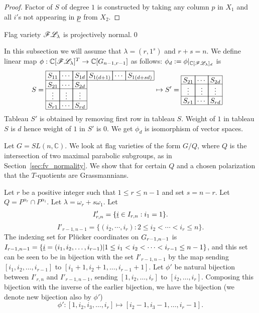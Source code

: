 {\begin{proof}
    Factor of \(S\) of degree \(1\) is constructed by taking any column \(p\) in \(X_1\) 
    and all \(i'\)s not appearing in \(\underline{p}\) from \(X_2\).
\end{proof}
\begin{corollary}
    Flag variety \(\mathscr{F}\mathscr{L}_{\lambda}\) is projectively normal.\qed
\end{corollary}
In this subsection we will assume that \(\lambda = (r,1^s)\) and \(r+s=n\). 
We define linear map \(\phi:\mathbb{C}[\mathscr{F}\mathscr{L}_{\lambda}]^T \to \mathbb{C}[G_{{n-1},{r-1}}]\) as follows: \(\phi_d := \phi|_{\mathbb{C}[\mathscr{F}\mathscr{L}_{\lambda}]_d}\) is
\begin{align*}
    S=
    \begin{array}[c]{*{6}c}\cline{1-6}
        \lr{S_{11}}&\lr{\cdots}&\lr{S_{1d}}&\lr{S_{1(d+1)}}&\lr{\cdots}&\lr{S_{1(d+sd)}}\\\cline{1-6}
        \lr{S_{21}}&\lr{\cdots}&\lr{S_{2d}}\\\cline{1-3}
        \lr{\vdots}&\lr{\vdots}&\lr{\vdots}\\\cline{1-3}
        \lr{S_{r1}}&\lr{\cdots}&\lr{S_{rd}}\\\cline{1-3}
    \end{array}
    &\mapsto S'=
    \begin{array}[c]{*{3}c}\cline{1-3}
        \lr{S_{21}}&\lr{\cdots}&\lr{S_{2d}}\\\cline{1-3}
        \lr{\vdots}&\lr{\vdots}&\lr{\vdots}\\\cline{1-3}
        \lr{S_{r1}}&\lr{\cdots}&\lr{S_{rd}}\\\cline{1-3}
    \end{array}
\end{align*}
Tableau \(S'\) is obtained by removing first row in tableau \(S\). Weight of \(1\) in tableau \(S\) is \(d\) hence weight of \(1\) in \(S'\) is \(0\). We get \(\phi_d\) is isomorphism of vector spaces. 
}
Let $G=SL(n,{\mathbb C})$. We look at flag varieties of the form $G/Q$, where $Q$ is the intersection of two maximal parabolic subgroups, as in Section~\ref{sec:fv_normality}. 
We show that for certain $Q$ and a chosen polarization that the $T$-quotients are Grassmannians.
 
Let $r$ be a positive integer such that $1 \leq r \leq n-1$ and set $s = n-r$.  Let  $Q = P^{\alpha_r} \cap P^{\alpha_1}$. Let $\lambda = \omega_r + s\omega_1$.
Let \[I'_{r,n} = \{{\underline i} \in I_{r,n} : i_1 = 1\}.\]
\[I'_{r-1,n-1} = \{(i_2,\cdots,i_r):2 \le i_2 < \cdots < i_r \le n\}.\]
The indexing set for  Pl\"{u}cker coordinates on \(G_{{r-1},{n-1}}\) is $I_{r-1,n-1} = \{ \underline{i}=(i_1,i_2,\ldots,i_{r-1}) | 1 \leq i_1 < i_2 < \cdots < i_{r-1} \leq n-1\}$, and this set can be seen to be in bijection with the set $I'_{r-1,n-1}$ by the map sending 
$[i_1,i_2,\ldots,i_{r-1}]$ to $[i_1 + 1, i_2 + 1,\ldots, i_{r-1}+1]$.  Let \(\phi'\) be natural bijection between \(I'_{r,n}\) and \(I'_{r-1,n-1}\), sending $[1, i_2,\ldots,i_r]$ to $[i_2,\ldots,i_r]$.
Composing this bijection with the inverse of the earlier bijection, we have the bijection (we denote new bijection also by \(\phi'\))
$$\phi':[1, i_2,i_3,\ldots, i_r] \mapsto [i_2-1,i_3-1,\ldots,i_r - 1].$$

